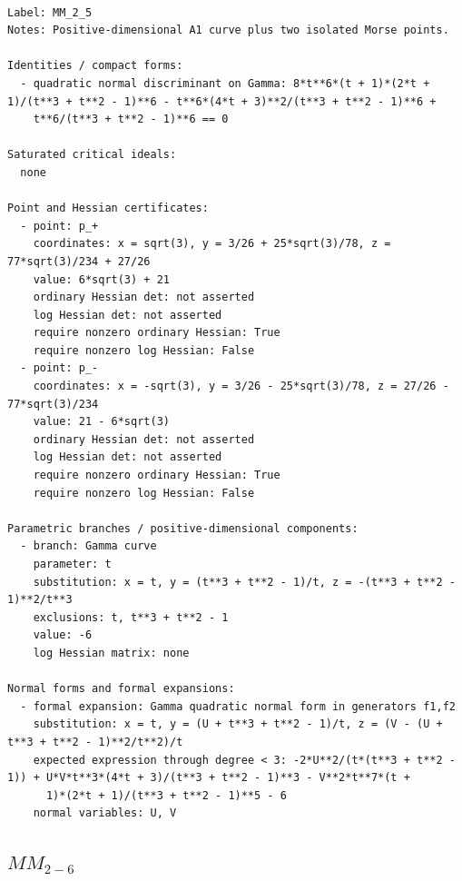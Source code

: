 \documentclass[10pt,a4paper]{article}
\begin{document}
\begin{lstlisting}

Label: MM_2_5
Notes: Positive-dimensional A1 curve plus two isolated Morse points.

Identities / compact forms:
  - quadratic normal discriminant on Gamma: 8*t**6*(t + 1)*(2*t + 1)/(t**3 + t**2 - 1)**6 - t**6*(4*t + 3)**2/(t**3 + t**2 - 1)**6 +
    t**6/(t**3 + t**2 - 1)**6 == 0

Saturated critical ideals:
  none

Point and Hessian certificates:
  - point: p_+
    coordinates: x = sqrt(3), y = 3/26 + 25*sqrt(3)/78, z = 77*sqrt(3)/234 + 27/26
    value: 6*sqrt(3) + 21
    ordinary Hessian det: not asserted
    log Hessian det: not asserted
    require nonzero ordinary Hessian: True
    require nonzero log Hessian: False
  - point: p_-
    coordinates: x = -sqrt(3), y = 3/26 - 25*sqrt(3)/78, z = 27/26 - 77*sqrt(3)/234
    value: 21 - 6*sqrt(3)
    ordinary Hessian det: not asserted
    log Hessian det: not asserted
    require nonzero ordinary Hessian: True
    require nonzero log Hessian: False

Parametric branches / positive-dimensional components:
  - branch: Gamma curve
    parameter: t
    substitution: x = t, y = (t**3 + t**2 - 1)/t, z = -(t**3 + t**2 - 1)**2/t**3
    exclusions: t, t**3 + t**2 - 1
    value: -6
    log Hessian matrix: none

Normal forms and formal expansions:
  - formal expansion: Gamma quadratic normal form in generators f1,f2
    substitution: x = t, y = (U + t**3 + t**2 - 1)/t, z = (V - (U + t**3 + t**2 - 1)**2/t**2)/t
    expected expression through degree < 3: -2*U**2/(t*(t**3 + t**2 - 1)) + U*V*t**3*(4*t + 3)/(t**3 + t**2 - 1)**3 - V**2*t**7*(t +
      1)*(2*t + 1)/(t**3 + t**2 - 1)**5 - 6
    normal variables: U, V

\end{lstlisting}

\subsection*{$ MM_{2-6} $}
\end{document}
